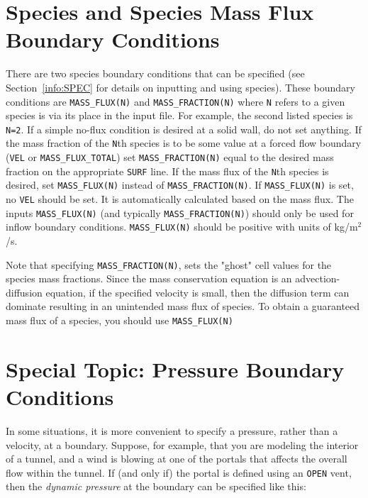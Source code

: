 \documentclass[11pt]{book}
\newcommand{\ct}{\tt\small}
\begin{document}
\clearpage

\section{Species and Species Mass Flux Boundary Conditions}

\label{info:MASS_FLUX}

There are two species boundary conditions that can be specified
(see Section~\ref{info:SPEC} for details on inputting and using species).
These boundary conditions are {\ct MASS\_FLUX(N)} and {\ct MASS\_FRACTION(N)}
where {\ct N} refers to a given species is via its place in the
input file. For example, the second listed species is {\ct N=2}.
If a simple no-flux condition is desired at a solid wall, do not set
anything. If the mass fraction of the {\ct N}th species is to be some
value at a forced flow boundary ({\ct VEL} or {\ct MASS\_FLUX\_TOTAL}) set
{\ct MASS\_FRACTION(N)} equal to the desired mass fraction on the appropriate
{\ct SURF} line.
If the mass flux of the {\ct N}th species is desired, set
{\ct MASS\_FLUX(N)} instead of {\ct MASS\_FRACTION(N)}.
If {\ct MASS\_FLUX(N)}
is set, no {\ct VEL} should be set. It is automatically
calculated based on the mass flux.
The inputs {\ct MASS\_FLUX(N)} (and typically {\ct MASS\_FRACTION(N)}) should only be used
for inflow boundary conditions.  {\ct MASS\_FLUX(N)} should be positive with
units of kg/m$^2$/s.

\begin{warning}
\noindent
Note that specifying {\ct MASS\_FRACTION(N)}, sets the "ghost" cell values for the species
mass fractions.  Since the mass conservation equation is an advection-diffusion equation,
if the specified velocity is small, then the diffusion term can dominate resulting in an unintended
mass flux of species.  To obtain a guaranteed mass flux of a species, you should use {\ct MASS\_FLUX(N)}
\end{warning}


\clearpage

\section{Special Topic: Pressure Boundary Conditions}
\label{info:pressure_boundary}

In some situations, it is more convenient to specify a pressure, rather than a velocity, at a boundary. Suppose, for example, that you are modeling the
interior of a tunnel, and a wind is blowing at one of the portals that affects the overall flow within the tunnel. If (and only if) the portal is defined using an
{\ct OPEN} vent, then the {\em dynamic pressure} at the boundary can be specified like this:
\end{document}
